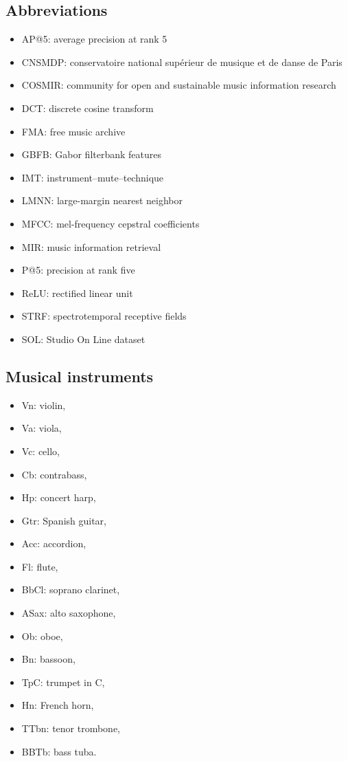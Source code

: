 \documentclass{bmcart}
\begin{document}
\begin{backmatter}

\section*{Abbreviations}

\begin{itemize}
  \item AP@5: average precision at rank 5
  \item CNSMDP: conservatoire national sup\'erieur de musique et de danse de Paris
  \item COSMIR: community for open and sustainable music information research
  \item DCT: discrete cosine transform
  \item FMA: free music archive
  \item GBFB: Gabor filterbank features
  \item IMT: instrument--mute--technique
  \item LMNN: large-margin nearest neighbor
  \item MFCC: mel-frequency cepstral coefficients
  \item MIR: music information retrieval
  \item P@5: precision at rank five
  \item ReLU: rectified linear unit
  \item STRF: spectrotemporal receptive fields
  \item SOL: Studio On Line dataset
\end{itemize}

\subsection*{Musical instruments}

\begin{itemize}
  \item Vn: violin,
  \item Va: viola,
  \item Vc: cello,
  \item Cb: contrabass,
  \item Hp: concert harp,
  \item Gtr: Spanish guitar,
  \item Acc: accordion,
  \item Fl: flute,
  \item BbCl: soprano clarinet,
  \item ASax: alto saxophone,
  \item Ob: oboe,
  \item Bn: bassoon,
  \item TpC: trumpet in C,
  \item Hn: French horn,
  \item TTbn: tenor trombone,
  \item BBTb: bass tuba.
\end{itemize}


\end{backmatter}
\end{document}

